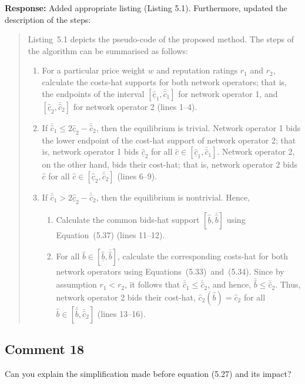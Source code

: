 \documentclass[10pt,a4paper,notitlepage]{article}
\numberwithin{equation}{section}
\begin{document}
\textbf{Response:}
Added appropriate listing (Listing 5.1). Furthermore, updated the description of the steps:
\begin{quote}
Listing~5.1 depicts the pseudo-code of the proposed method. The steps of the algorithm can be summarised as follows:
\begin{enumerate}
\item For a particular price weight $w$ and reputation ratings $r_1$ and $r_2$, calculate the costs-hat supports for both network operators; that is, the endpoints of the interval $[\underline{\hat{c}}_1, \bar{\hat{c}}_1]$ for network operator 1, and $[\underline{\hat{c}}_2, \bar{\hat{c}}_2]$ for network operator 2 (lines 1--4).
\item If $\bar{\hat{c}}_1 \le 2\underline{\hat{c}}_2 - \bar{\hat{c}}_2$, then the equilibrium is trivial. Network operator 1 bids the lower endpoint of the cost-hat support of network operator 2; that is, network operator 1 bids $\underline{\hat{c}}_2$ for all $\hat{c}\in [\underline{\hat{c}}_1, \bar{\hat{c}}_1]$. Network operator 2, on the other hand, bids their cost-hat; that is, network operator 2 bids $\hat{c}$ for all $\hat{c}\in [\underline{\hat{c}}_2, \bar{\hat{c}}_2]$ (lines 6--9).
\item If $\bar{\hat{c}}_1 > 2\underline{\hat{c}}_2 - \bar{\hat{c}}_2$, then the equilibrium is nontrivial. Hence,
\begin{enumerate}
\item Calculate the common bids-hat support $[\underline{\hat{b}}, \bar{\hat{b}}]$ using Equation~(5.37) (lines 11--12).
\item For all $\hat{b}\in [\underline{\hat{b}}, \bar{\hat{b}}]$, calculate the corresponding costs-hat for both network operators using Equations~(5.33)~and~(5.34). Since by assumption $r_1 < r_2$, it follows that $\bar{\hat{c}}_1 \le \bar{\hat{c}}_2$, and hence, $\bar{\hat{b}}\le \bar{\hat{c}}_2$. Thus, network operator 2 bids their cost-hat, $\hat{c}_2(\hat{b}) = \hat{c}_2$ for all $\hat{b}\in [\bar{\hat{b}}, \bar{\hat{c}}_2]$ (lines 13--16).
\end{enumerate}
\end{enumerate}
\end{quote}

\subsection{Comment 18}
Can you explain the simplification made before equation (5.27) and its impact?
\end{document}
